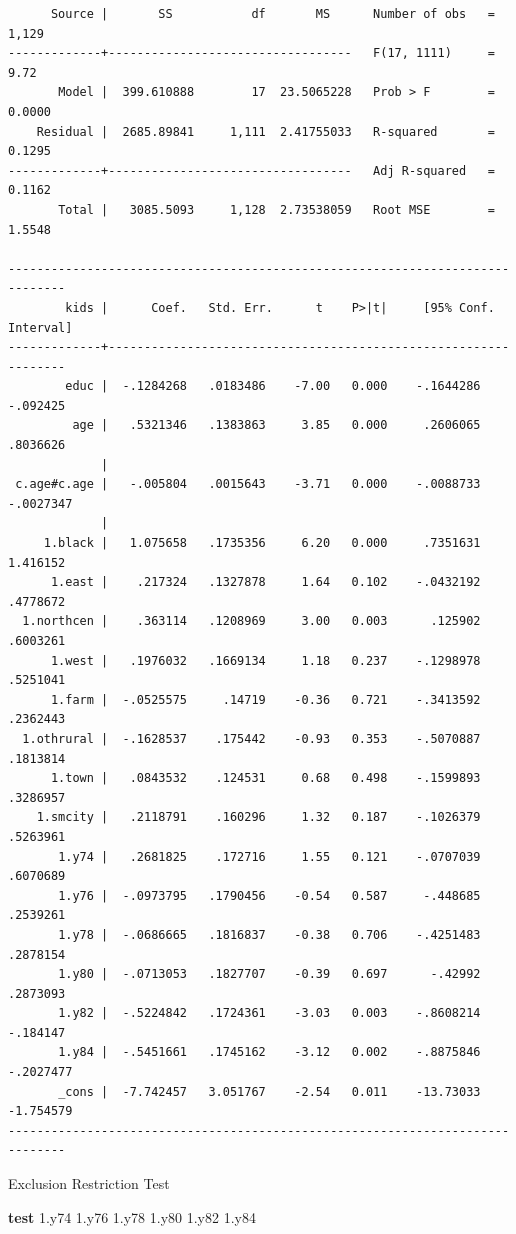 \documentclass[
]{book}
\newenvironment{Shaded}{\begin{snugshade}}{\end{snugshade}}
\newcommand{\KeywordTok}[1]{\textcolor[rgb]{0.13,0.29,0.53}{\textbf{#1}}}
\newcommand{\NormalTok}[1]{#1}
\begin{document}
\begin{verbatim}
      Source |       SS           df       MS      Number of obs   =     1,129
-------------+----------------------------------   F(17, 1111)     =      9.72
       Model |  399.610888        17  23.5065228   Prob > F        =    0.0000
    Residual |  2685.89841     1,111  2.41755033   R-squared       =    0.1295
-------------+----------------------------------   Adj R-squared   =    0.1162
       Total |   3085.5093     1,128  2.73538059   Root MSE        =    1.5548

------------------------------------------------------------------------------
        kids |      Coef.   Std. Err.      t    P>|t|     [95% Conf. Interval]
-------------+----------------------------------------------------------------
        educ |  -.1284268   .0183486    -7.00   0.000    -.1644286    -.092425
         age |   .5321346   .1383863     3.85   0.000     .2606065    .8036626
             |
 c.age#c.age |   -.005804   .0015643    -3.71   0.000    -.0088733   -.0027347
             |
     1.black |   1.075658   .1735356     6.20   0.000     .7351631    1.416152
      1.east |    .217324   .1327878     1.64   0.102    -.0432192    .4778672
  1.northcen |    .363114   .1208969     3.00   0.003      .125902    .6003261
      1.west |   .1976032   .1669134     1.18   0.237    -.1298978    .5251041
      1.farm |  -.0525575     .14719    -0.36   0.721    -.3413592    .2362443
  1.othrural |  -.1628537    .175442    -0.93   0.353    -.5070887    .1813814
      1.town |   .0843532    .124531     0.68   0.498    -.1599893    .3286957
    1.smcity |   .2118791    .160296     1.32   0.187    -.1026379    .5263961
       1.y74 |   .2681825    .172716     1.55   0.121    -.0707039    .6070689
       1.y76 |  -.0973795   .1790456    -0.54   0.587     -.448685    .2539261
       1.y78 |  -.0686665   .1816837    -0.38   0.706    -.4251483    .2878154
       1.y80 |  -.0713053   .1827707    -0.39   0.697      -.42992    .2873093
       1.y82 |  -.5224842   .1724361    -3.03   0.003    -.8608214    -.184147
       1.y84 |  -.5451661   .1745162    -3.12   0.002    -.8875846   -.2027477
       _cons |  -7.742457   3.051767    -2.54   0.011    -13.73033   -1.754579
------------------------------------------------------------------------------
\end{verbatim}

Exclusion Restriction Test

\begin{Shaded}
\begin{Highlighting}[]
\KeywordTok{test}\NormalTok{ 1.y74 1.y76 1.y78 1.y80 1.y82 1.y84}
\end{Highlighting}
\end{Shaded}
\end{document}
